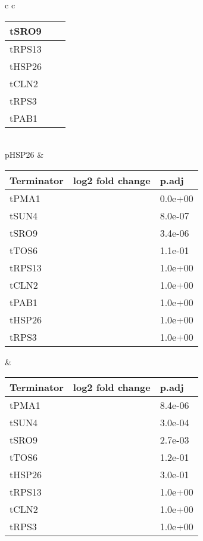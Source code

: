 \documentclass[../main.tex]{subfiles}
\begin{document}
\begin{table}[h!]
{\begin{tabular}{ c c }
\begin{tabularx}{0.4\textwidth} { 
  | >{\centering\arraybackslash}X 
  | >{\centering\arraybackslash}X 
  | >{\centering\arraybackslash}X | }
\hline
tSRO9 & -0.7268833 & 0.000\\
\hline
tRPS13 & -0.0881267 & 0.330\\
\hline
tHSP26 & 0.1310147 & 0.300\\
\hline
tCLN2 & 0.2638312 & 0.015\\
\hline
tRPS3 & 0.3529039 & 0.001\\
\hline
tPAB1 & 0.6543571 & 0.000\\
\hline
\end{tabularx}
\\ pHSP26 &  \\
\begin{tabularx}{0.4\textwidth} { 
  | >{\centering\arraybackslash}X 
  | >{\centering\arraybackslash}X 
  | >{\centering\arraybackslash}X | }
\hline
\textbf{Terminator} & \textbf{log2 fold change} & \textbf{p.adj}\\
\hline
tPMA1 & -1.6289649 & 0.0e+00\\
\hline
tSUN4 & -1.2574579 & 8.0e-07\\
\hline
tSRO9 & -1.1746048 & 3.4e-06\\
\hline
tTOS6 & -0.5805808 & 1.1e-01\\
\hline
tRPS13 & -0.1965647 & 1.0e+00\\
\hline
tCLN2 & -0.1252409 & 1.0e+00\\
\hline
tPAB1 & -0.0616474 & 1.0e+00\\
\hline
tHSP26 & 0.0319040 & 1.0e+00\\
\hline
tRPS3 & 0.1164520 & 1.0e+00\\
\hline
\end{tabularx}
&
\begin{tabularx}{0.4\textwidth} { 
  | >{\centering\arraybackslash}X 
  | >{\centering\arraybackslash}X 
  | >{\centering\arraybackslash}X | }
\hline
\textbf{Terminator} & \textbf{log2 fold change} & \textbf{p.adj}\\
\hline
tPMA1 & -1.5432817 & 8.4e-06\\
\hline
tSUN4 & -1.2474233 & 3.0e-04\\
\hline
tSRO9 & -1.0514050 & 2.7e-03\\
\hline
tTOS6 & -0.6661552 & 1.2e-01\\
\hline
tHSP26 & -0.5293229 & 3.0e-01\\
\hline
tRPS13 & -0.3155979 & 1.0e+00\\
\hline
tCLN2 & -0.1610090 & 1.0e+00\\
\hline
tRPS3 & -0.0913532 & 1.0e+00\\
\hline

\end{tabularx}
\end{tabular}}
\end{table}
\end{document}

